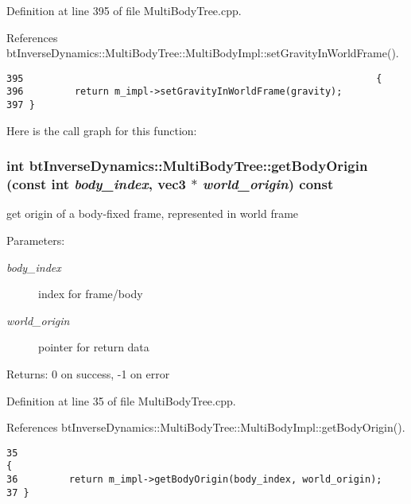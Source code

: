 Definition at line 395 of file MultiBodyTree.cpp.

References btInverseDynamics::MultiBodyTree::MultiBodyImpl::setGravityInWorldFrame().

\begin{Code}\begin{verbatim}395                                                              {
396         return m_impl->setGravityInWorldFrame(gravity);
397 }
\end{verbatim}
\end{Code}




Here is the call graph for this function:\hypertarget{classbt_inverse_dynamics_1_1_multi_body_tree_14722e25a8c6cc0cb0d1ba848577e174}{
\subsubsection[getBodyOrigin]{\setlength{\rightskip}{0pt plus 5cm}int btInverseDynamics::MultiBodyTree::getBodyOrigin (const int {\em body\_\-index}, \/  {\bf vec3} $\ast$ {\em world\_\-origin}) const}}
\label{classbt_inverse_dynamics_1_1_multi_body_tree_14722e25a8c6cc0cb0d1ba848577e174}


get origin of a body-fixed frame, represented in world frame \begin{Desc}
\item[Parameters:]
\begin{description}
\item[{\em body\_\-index}]index for frame/body \item[{\em world\_\-origin}]pointer for return data \end{description}
\end{Desc}
\begin{Desc}
\item[Returns:]0 on success, -1 on error \end{Desc}


Definition at line 35 of file MultiBodyTree.cpp.

References btInverseDynamics::MultiBodyTree::MultiBodyImpl::getBodyOrigin().

\begin{Code}\begin{verbatim}35                                                                                {
36         return m_impl->getBodyOrigin(body_index, world_origin);
37 }
\end{verbatim}
\end{Code}




